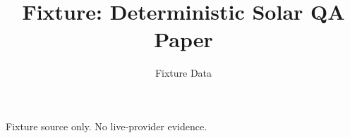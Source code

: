 \documentclass{article}
\title{Fixture: Deterministic Solar QA Paper}
\author{Fixture Data}
\begin{document}
\maketitle
Fixture source only. No live-provider evidence.
\end{document}
